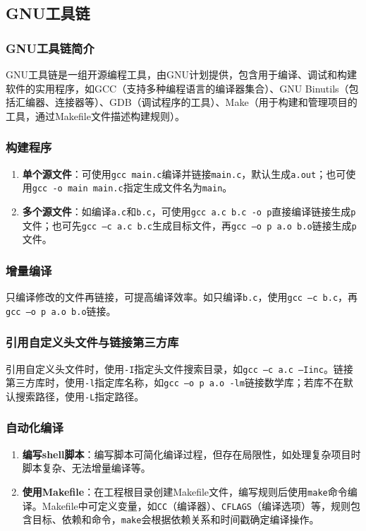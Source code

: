 \subsection{GNU工具链}
\subsubsection{GNU工具链简介}
GNU工具链是一组开源编程工具，由GNU计划提供，包含用于编译、调试和构建软件的实用程序，如GCC（支持多种编程语言的编译器集合）、GNU Binutils（包括汇编器、连接器等）、GDB（调试程序的工具）、Make（用于构建和管理项目的工具，通过Makefile文件描述构建规则）。

\subsubsection{构建程序}
\begin{enumerate}[label=\arabic*.]
    \item \textbf{单个源文件}：可使用\texttt{gcc main.c}编译并链接\texttt{main.c}，默认生成\texttt{a.out}；也可使用\texttt{gcc -o main main.c}指定生成文件名为\texttt{main}。
    \item \textbf{多个源文件}：如编译\texttt{a.c}和\texttt{b.c}，可使用\texttt{gcc a.c b.c -o p}直接编译链接生成\texttt{p}文件；也可先\texttt{gcc –c a.c b.c}生成目标文件，再\texttt{gcc –o p a.o b.o}链接生成\texttt{p}文件。
\end{enumerate}

\subsubsection{增量编译}
只编译修改的文件再链接，可提高编译效率。如只编译\texttt{b.c}，使用\texttt{gcc –c b.c}，再\texttt{gcc –o p a.o b.o}链接。

\subsubsection{引用自定义头文件与链接第三方库}
引用自定义头文件时，使用\texttt{-I}指定头文件搜索目录，如\texttt{gcc –c a.c –Iinc}。链接第三方库时，使用\texttt{-l}指定库名称，如\texttt{gcc –o p a.o -lm}链接数学库；若库不在默认搜索路径，使用\texttt{-L}指定路径。

\subsubsection{自动化编译}
\begin{enumerate}[label=\arabic*.]
    \item \textbf{编写shell脚本}：编写脚本可简化编译过程，但存在局限性，如处理复杂项目时脚本复杂、无法增量编译等。
    \item \textbf{使用Makefile}：在工程根目录创建Makefile文件，编写规则后使用\texttt{make}命令编译。Makefile中可定义变量，如\texttt{CC}（编译器）、\texttt{CFLAGS}（编译选项）等，规则包含目标、依赖和命令，\texttt{make}会根据依赖关系和时间戳确定编译操作。
\end{enumerate}

